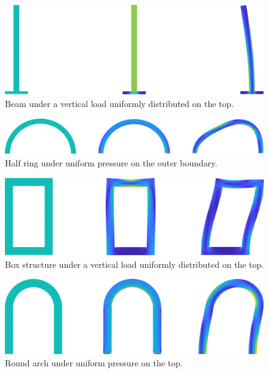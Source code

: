 \documentclass[a4paper,11pt]{article}
\theoremstyle{definition}
\begin{document}
\begin{figure}[p]
\includegraphics[width=\textwidth]{../fem/examples/beam.pdf}
\caption{Beam under a vertical load uniformly distributed on the top.}
\end{figure}
\begin{figure}[p]
\includegraphics[width=\textwidth]{../fem/examples/halfring.pdf}
\caption{Half ring under uniform pressure on the outer boundary.}
\end{figure}
\begin{figure}[p]
\includegraphics[width=\textwidth]{../fem/examples/box.pdf}
\caption{Box structure under a vertical load uniformly distributed on the top.}
\end{figure}
\begin{figure}[p]
\includegraphics[width=\textwidth]{../fem/examples/roundarch.pdf}
\caption{Round arch under uniform pressure on the top.}
\end{figure}

\appendix

\nocite{antman}
\nocite{brezis}
\printbibliography
\end{document}
